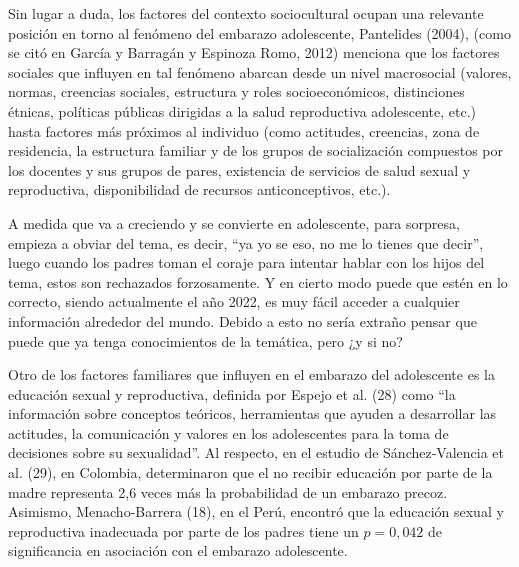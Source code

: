 \documentclass[letterpaper, 12pt]{article}
\begin{document}
\begin{displayquote}
    Sin lugar a duda, los factores del contexto sociocultural ocupan una relevante posición en
    torno al fenómeno del embarazo adolescente, Pantelides (2004), (como se citó en García y Barragán y
    Espinoza Romo, 2012) menciona que los factores sociales que influyen en tal fenómeno abarcan
    desde un nivel macrosocial (valores, normas, creencias sociales, estructura y roles socioeconómicos,
    distinciones étnicas, políticas públicas dirigidas a la salud reproductiva adolescente, etc.) hasta
    factores más próximos al individuo (como actitudes, creencias, zona de residencia, la estructura
    familiar y de los grupos de socialización compuestos por los docentes y sus grupos de pares,
    existencia de servicios de salud sexual y reproductiva, disponibilidad de recursos anticonceptivos,
    etc.).

    \textcite{Garcia2017}

\end{displayquote}

A medida que va a creciendo y se convierte en adolescente,
para sorpresa, empieza a obviar del tema, es decir, ``ya yo
se eso, no me lo tienes que decir'', luego cuando los
padres toman el coraje para intentar hablar con los hijos
del tema, estos son rechazados forzosamente. Y en cierto
modo puede que estén en lo correcto, siendo actualmente el
año 2022, es muy fácil acceder a cualquier información
alrededor del mundo. Debido a esto no sería extraño pensar
que puede que ya tenga conocimientos de la temática, pero
¿y si no?

\begin{displayquote}
    Otro de los factores familiares que influyen en el embarazo del adolescente es la educación
    sexual y reproductiva, definida por Espejo et al. (28) como “la información
    sobre conceptos teóricos, herramientas que ayuden a desarrollar las actitudes, la comunicación
    y valores en los adolescentes para la toma de decisiones sobre su sexualidad”. Al respecto, en
    el estudio de Sánchez-Valencia et al. (29), en Colombia, determinaron
    que el no recibir educación por parte de la madre representa 2,6 veces más
    la probabilidad de un embarazo precoz. Asimismo, Menacho-Barrera (18), en
    el Perú, encontró que la educación sexual y reproductiva inadecuada por
    parte de los padres tiene un $p = 0,042$ de significancia en asociación
    con el embarazo adolescente.

    \textcite{CubaSancho2022}
\end{displayquote}
\end{document}

